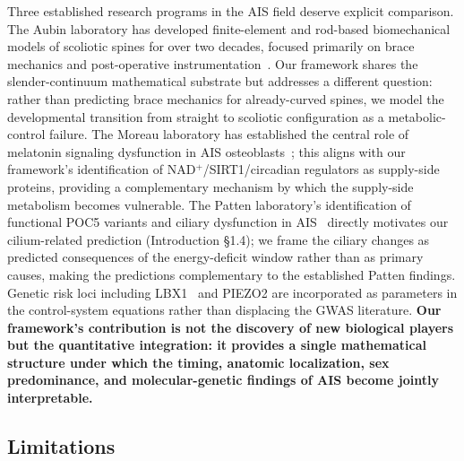 Three established research programs in the AIS field deserve explicit comparison. The Aubin laboratory has developed finite-element and rod-based biomechanical models of scoliotic spines for over two decades, focused primarily on brace mechanics and post-operative instrumentation~\cite{perie2003boston, clin2010brace}. Our framework shares the slender-continuum mathematical substrate but addresses a different question: rather than predicting brace mechanics for already-curved spines, we model the developmental transition from straight to scoliotic configuration as a metabolic-control failure. The Moreau laboratory has established the central role of melatonin signaling dysfunction in AIS osteoblasts~\cite{moreau2004melatonin}; this aligns with our framework's identification of NAD$^+$/SIRT1/circadian regulators as supply-side proteins, providing a complementary mechanism by which the supply-side metabolism becomes vulnerable. The Patten laboratory's identification of functional POC5 variants and ciliary dysfunction in AIS~\cite{patten2015poc5} directly motivates our cilium-related prediction (Introduction §1.4); we frame the ciliary changes as predicted consequences of the energy-deficit window rather than as primary causes, making the predictions complementary to the established Patten findings. Genetic risk loci including LBX1~\cite{sharma2015tbx6, wise2020genetics} and PIEZO2 are incorporated as parameters in the control-system equations rather than displacing the GWAS literature. \textbf{Our framework's contribution is not the discovery of new biological players but the quantitative integration: it provides a single mathematical structure under which the timing, anatomic localization, sex predominance, and molecular-genetic findings of AIS become jointly interpretable.}

\subsection{Limitations}

